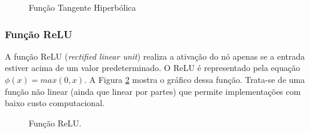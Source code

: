 \begin{center}
    \begin{figure}
        \centering
    \caption{Função Tangente Hiperbólica}\label{fg:funcao_tanh}
	\end{figure}
\end{center}



\subsubsection{Função ReLU}
\label{subsec:relu}
A função ReLU (\textit{rectified linear unit}) realiza a ativação do nó apenas se a entrada estiver acima de um valor predeterminado. O ReLU é representado pela equação $\phi (x) = max(0,x)$. A Figura \ref{fig:relu} mostra o gráfico dessa função. Trata-se de uma função não linear (ainda que linear por partes) que permite implementações com baixo custo computacional.

\begin{figure}[!htb]
    \centering
    
\caption{Função ReLU. \label{fig:relu}}
\end{figure}